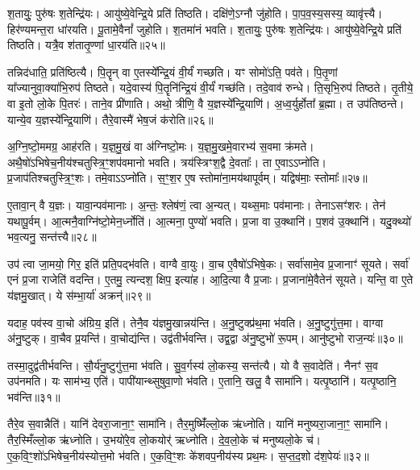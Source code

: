 श॒तायुः॒ पुरु॑षः श॒तेन्द्रि॑यः।
आयु॑ष्ये॒वेन्द्रि॒ये प्रति॑ तिष्ठति।
दक्षि॑णे॒\-ऽग्नौ जु॑होति।
पा॒प॒व॒स्य॒सस्य॒ व्यावृ॑त्त्यै।
हिर॑ण्यमन्त॒रा धा॑रयति।
पू॒तामे॒वैनां᳚ जुहोति।
श॒तमा॑नं भवति।
श॒तायुः॒ पुरु॑षः श॒तेन्द्रि॑यः।
आयु॑ष्ये॒वेन्द्रि॒ये प्रति॑ तिष्ठति।
यत्रै॒व श॑तातृ॒ण्णां धा॒रय॑ति॥२५॥\ip

तन्निद॑धाति॒ प्रति॑\-ष्ठित्यै।
पि॒तॄन् वा ए॒तस्ये᳚न्द्रि॒यं वी॒र्यं॑ गच्छति।
यꣳ सोमो॑ऽति॒ पव॑ते।
पि॒तृ॒णां या᳚ज्यानुवा॒क्या॑भि॒रुप॑ तिष्ठते।
यदे॒वास्य॑ पि॒तॄनि॑न्द्रि॒यं वी॒र्यं॑ गच्छ॑ति।
तदे॒वाव॑ रुन्धे।
ति॒सृभि॒रुप॑ तिष्ठते।
तृ॒तीये॒ वा इ॒तो लो॒के पि॒तरः॑।
ताने॒व प्री॑णाति।
अथो॒ त्रीणि॒ वै य॒ज्ञस्ये᳚न्द्रि॒याणि॑।
अ॒ध्व॒र्युर्\mbox{}होता᳚ ब्र॒ह्मा।
त उप॑तिष्ठन्ते।
यान्ये॒व य॒ज्ञस्ये᳚न्द्रि॒याणि॑।
तैरे॒वास्मै॑ भेष॒जं क॑रोति॥२६॥\ip\anuvakamend[प्री॒णा॒ति॒ प्र॒थ॒मो दक्षि॑णा स॒मव॑नयति धा॒रय॑तीन्द्रि॒याणि॑ च॒त्वारि॑ च]

अ॒ग्नि॒ष्टो॒ममग्र॒ आह॑रति।
य॒ज्ञ॒\-मु॒खं वा अ॑ग्निष्टो॒मः।
य॒ज्ञ॒\-मु॒खमे॒वारभ्य॑ स॒वमा क्र॑मते।
अथै॒षो॑\-ऽभिषेच॒नीय॑श्चतु\-स्त्रि॒ꣳ॒शप॑वमानो भवति।
त्रय॑स्त्रिꣳश॒द्वै दे॒वताः᳚।
ता ए॒वाऽऽप्नो॑ति।
प्र॒जा\-प॑तिश्चतुस्त्रि॒ꣳ॒शः।
तमे॒वाऽऽप्नो॑ति।
स॒ꣳ॒श॒र ए॒ष स्तोमा॑ना॒मय॑था\-पूर्वम्।
यद्विष॑माः॒ स्तोमाः᳚॥२७॥\ip

ए॒तावा॒न् वै य॒ज्ञः।
यावा॒न्पव॑मानाः।
अ॒न्तः॒ श्लेष॑णं॒ त्वा अ॒न्यत्।
यथ्स॒माः पव॑मानाः।
तेनाऽसꣳ॑शरः।
तेन॑ यथापू॒र्वम्।
आ॒त्मनै॒वाग्नि॑ष्टो॒मेन॒र्ध्नोति॑।
आ॒त्मना॒ पुण्यो॑ भवति।
प्र॒जा वा उ॒क्थानि॑।
प॒शव॑ उ॒क्थानि॑।
यदु॒क्थ्यो॑ भव॒त्यनु॒ सन्त॑त्त्यै॥२८॥\ip\anuvakamend[स्तोमाः᳚ प॒शव॑ उ॒क्थान्येकं॑ च]

उप॑ त्वा जा॒मयो॒ गिर॒ इति॑ प्रति॒पद्भ॑वति।
वाग्वै वा॒युः।
वा॒च ए॒वैषो॑\-ऽभिषे॒कः।
सर्वा॑सामे॒व प्र॒जानाꣳ॑ सूयते।
सर्वा॑ एनं प्र॒जा राजेति॑ वदन्ति।
ए॒तमु॒ त्यन्दश॒ क्षिप॒ इत्या॑ह।
आ॒दि॒त्या वै प्र॒जाः।
प्र॒जाना॑मे॒वैतेन॑ सूयते।
यन्ति॒ वा ए॒ते य॑ज्ञमु॒खात्।
ये स॑म्भा॒र्या॑ अक्रन्॑॥२९॥\ip

यदाह॒ पव॑स्व वा॒चो अ॑ग्रिय॒ इति॑।
तेनै॒व य॑ज्ञमु॒खान्नय॑न्ति।
अ॒नु॒ष्टुक्प्र॑थ॒मा भ॑वति।
अ॒नु॒ष्टुगु॑त्त॒मा।
वाग्वा अ॑नु॒ष्टुक्।
वा॒चैव प्र॒यन्ति॑।
वा॒चोद्य॑न्ति।
उद्व॑तीर्भवन्ति।
उद्व॒द्वा अ॑नु॒ष्टुभो॑ रू॒पम्।
आनु॑ष्टुभो राज॒न्यः॑॥३०॥\ip

तस्मा॒दुद्व॑तीर्भवन्ति।
सौ॒र्य॑नु॒ष्टुगु॑त्त॒मा भ॑वति।
सु॒व॒र्गस्य॑ लो॒कस्य॒ सन्त॑त्यै।
यो वै स॒वादेति॑।
नैनꣳ॑ स॒व उप॑नमति।
यः साम॑भ्य॒ एति॑।
पापी॑यान्थ्सुषुवा॒णो भ॑वति।
ए॒तानि॒ खलु॒ वै सामा॑नि।
यत्पृ॒ष्ठानि॑।
यत्पृ॒ष्ठानि॒ भव॑न्ति॥३१॥\ip

तैरे॒व स॒वान्नैति॑।
यानि॑ देवरा॒जाना॒ꣳ॒ सामा॑नि।
तैर॒मुष्मिँ॑ल्लो॒क ऋ॑ध्नोति।
यानि॑ मनुष्यरा॒जाना॒ꣳ॒ सामा॑नि।
तैर॒स्मिँल्लो॒क ऋ॑ध्नोति।
उ॒भयो॑रे॒व लो॒कयोर्॑ ऋध्नोति।
दे॒व॒लो॒के च॑ मनुष्यलो॒के च॑।
ए॒क॒वि॒ꣳ॒शो॑\-ऽभिषेच॒नीय॑स्योत्त॒मो भ॑वति।
ए॒क॒वि॒ꣳ॒शः के॑शवप॒नीय॑स्य प्रथ॒मः।
स॒प्त॒द॒शो द॑श॒पेयः॑॥३२॥\ip

